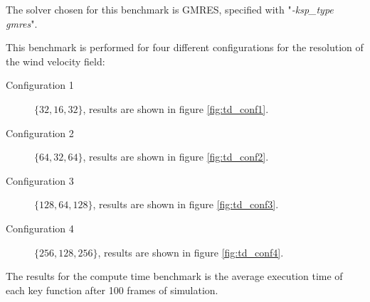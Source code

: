 The solver chosen for this benchmark is GMRES, specified with "\emph{-ksp\_type
gmres}".

This benchmark is performed for four different configurations for the resolution of
the wind velocity field:
\begin{description}
	\item[Configuration 1] $ \{ 32, 16, 32 \} $, results are shown in figure
		\ref{fig:td_conf1}.
	\item[Configuration 2] $ \{ 64, 32, 64 \} $, results are shown in figure
		\ref{fig:td_conf2}.
	\item[Configuration 3] $ \{ 128, 64, 128 \} $, results are shown in figure
		\ref{fig:td_conf3}.
	\item[Configuration 4] $ \{ 256, 128, 256 \} $, results are shown in figure
		\ref{fig:td_conf4}.
\end{description}

The results for the compute time benchmark is the average execution time of each
key function after 100 frames of simulation.

